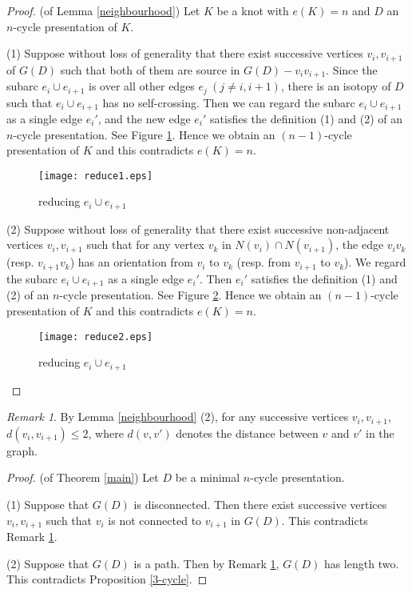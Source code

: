 \documentclass{amsart}
\theoremstyle{definition}
\theoremstyle{remark}
\newtheorem{remark}[theorem]{Remark}
\numberwithin{equation}{section}
\begin{document}
\begin{proof}(of Lemma \ref{neighbourhood})
Let $K$ be a knot with $e(K)=n$ and $D$ an $n$-cycle presentation of $K$.

(1) Suppose without loss of generality that there exist successive vertices $v_i, v_{i+1}$ of $G(D)$ such that both of them are source in $G(D)-v_iv_{i+1}$.
Since the subarc $e_i\cup e_{i+1}$ is over all other edges $e_j\ (j\ne i, i+1)$, there is an isotopy of $D$ such that $e_i\cup e_{i+1}$ has no self-crossing.
Then we can regard the subarc $e_i\cup e_{i+1}$ as a single edge $e_i'$, and the new edge $e_i'$ satisfies the definition (1) and (2) of an $n$-cycle presentation.
See Figure \ref{reduce1}.
Hence we obtain an $(n-1)$-cycle presentation of $K$ and this contradicts $e(K)=n$.

\begin{figure}[htbp]
	\begin{center}
	\texttt{[image: reduce1.eps]}
	\end{center}
	\caption{reducing $e_i\cup e_{i+1}$}
	\label{reduce1}
\end{figure}

(2) Suppose without loss of generality that there exist successive non-adjacent vertices $v_i,v_{i+1}$ such that for any vertex $v_k$ in $N(v_i)\cap N(v_{i+1})$, the edge $v_iv_k$ (resp. $v_{i+1}v_k$) has an orientation from $v_i$ to $v_k$ (resp. from $v_{i+1}$ to $v_k$).
We regard the subarc $e_i\cup e_{i+1}$ as a single edge $e_i'$.
Then $e_i'$ satisfies the definition (1) and (2) of an $n$-cycle presentation.
See Figure \ref{reduce2}.
Hence we obtain an $(n-1)$-cycle presentation of $K$ and this contradicts $e(K)=n$.
\begin{figure}[htbp]
	\begin{center}
	\texttt{[image: reduce2.eps]}
	\end{center}
	\caption{reducing $e_i\cup e_{i+1}$}
	\label{reduce2}
\end{figure}
\end{proof}

\begin{remark}\label{distance}
By Lemma \ref{neighbourhood} (2), for any successive vertices $v_i, v_{i+1}$, $d(v_i,v_{i+1})\le 2$, where $d(v,v')$ denotes the distance between $v$ and $v'$ in the graph.
\end{remark}

\begin{proof}(of Theorem \ref{main})
Let $D$ be a minimal $n$-cycle presentation.

(1) Suppose that $G(D)$ is disconnected.
Then there exist successive vertices $v_i,v_{i+1}$ such that $v_i$ is not connected to $v_{i+1}$ in $G(D)$.
This contradicts Remark \ref{distance}.

(2) Suppose that $G(D)$ is a path.
Then by Remark \ref{distance}, $G(D)$ has length two.
This contradicts Proposition \ref{3-cycle}.
\end{proof}
\end{document}
